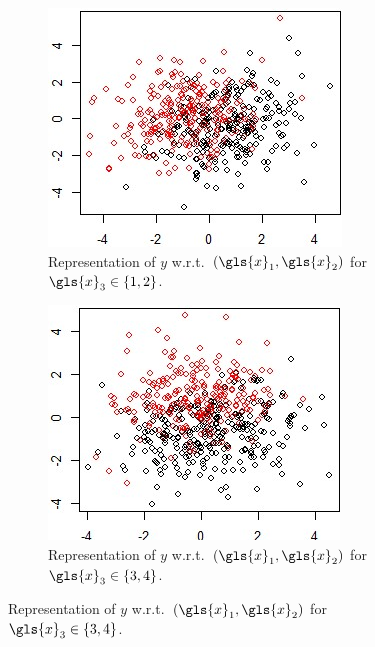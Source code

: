 \begin{figure}
\begin{subfigure}[t]{0.32\textwidth}
\includegraphics[width=\textwidth]{figures/chapitre6/graph_simu_1.jpg}
\caption{Representation of $y$ w.r.t.\ $(\gls{x}_1,\gls{x}_2)$ for $\gls{x}_3 \in \{1,2\}$.}
\label{fig:simu1}
\end{subfigure}
\begin{subfigure}[t]{0.32\textwidth}
\includegraphics[width=\textwidth]{figures/chapitre6/graph_simu_2.jpg}
\caption{Representation of $y$ w.r.t.\ $(\gls{x}_1,\gls{x}_2)$ for $\gls{x}_3 \in \{3,4\}$.}

\end{subfigure}
\end{figure}
